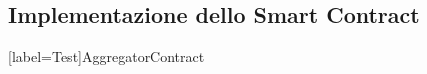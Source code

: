 \begin{appendices}

    \chapter{Implementazione dello Smart Contract}
    [label=Test]{AggregatorContract \label{cod:aggregatorContract}}
    \inputminted[linenos]{solidity}{../contracts/contracts/AggregatorContract.sol}

\end{appendices}